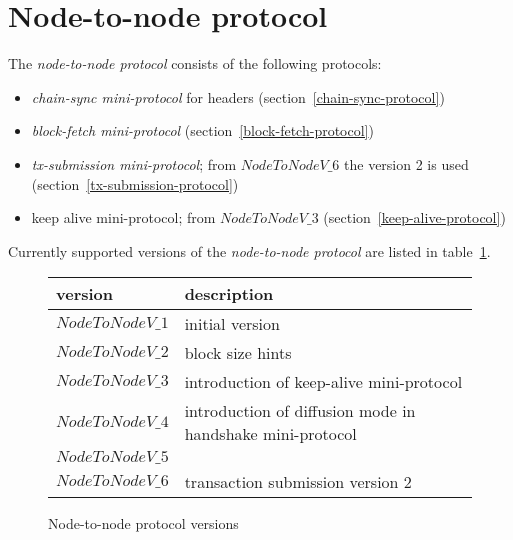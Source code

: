\section{Node-to-node protocol}
\label{section:node-to-node-protocol}
\newline
{}\newline

The \textit{node-to-node protocol} consists of the following protocols:
\begin{itemize}
  \item \textit{chain-sync mini-protocol} for headers (section~\ref{chain-sync-protocol})
  \item \textit{block-fetch mini-protocol} (section~\ref{block-fetch-protocol})
  \item \textit{tx-submission mini-protocol};  from $NodeToNodeV\_6$ the version
    2 is used  (section~\ref{tx-submission-protocol})
  \item keep alive mini-protocol; from $NodeToNodeV\_3$ (section~\ref{keep-alive-protocol})
\end{itemize}
Currently supported versions of the \textit{node-to-node protocol} are listed
in table~\ref{table:node-to-node-protocol-versions}.
\begin{figure}[h]
  \begin{center}
    \begin{tabular}{l|l}
      version         & description \\\hline\hline
      $NodeToNodeV\_1$ & initial version \\\hline
      $NodeToNodeV\_2$ & block size hints \\\hline
      $NodeToNodeV\_3$ & introduction of keep-alive mini-protocol \\\hline
      $NodeToNodeV\_4$ & introduction of diffusion mode in handshake mini-protocol \\\hline
      $NodeToNodeV\_5$ & \\\hline
      $NodeToNodeV\_6$ & transaction submission version 2 \\\hline
    \end{tabular}
    \caption{Node-to-node protocol versions}
    \label{table:node-to-node-protocol-versions}
  \end{center}
\end{figure}

